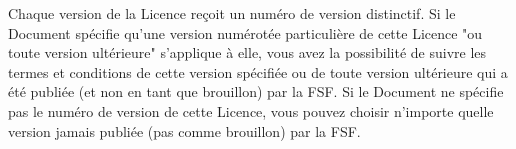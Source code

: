 	Chaque version de la Licence reçoit un num\'ero de version distinctif. Si le Document sp\'ecifie qu'une version num\'erot\'ee particulière de cette Licence "ou toute version ult\'erieure" s'applique à elle, vous avez la possibilit\'e de suivre les termes et conditions de cette version sp\'ecifi\'ee ou de toute version ult\'erieure qui a \'et\'e publi\'ee (et non en tant que brouillon) par la FSF. Si le Document ne sp\'ecifie pas le num\'ero de version de cette Licence, vous pouvez choisir n'importe quelle version jamais publi\'ee (pas comme brouillon) par la FSF.
	
	\begin{center}
	\end{center}
	
	\newpage
	\thispagestyle{empty}
	\mbox{}
